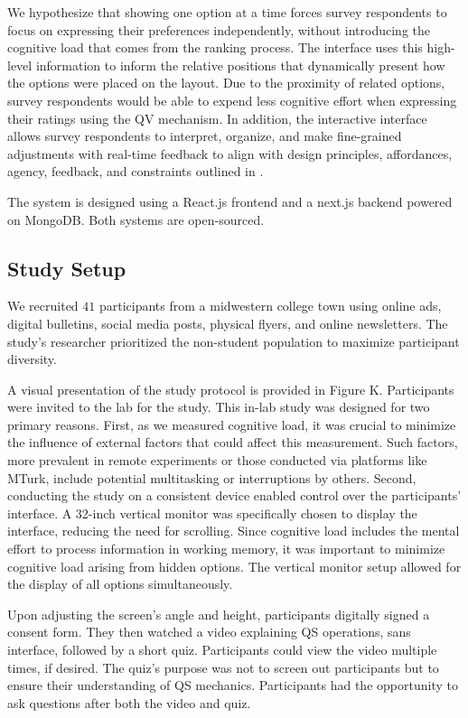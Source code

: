 We hypothesize that showing one option at a time forces survey respondents to focus on expressing their preferences independently, without introducing the cognitive load that comes from the ranking process. The interface uses this high-level information to inform the relative positions that dynamically present how the options were placed on the layout. Due to the proximity of related options, survey respondents would be able to expend less cognitive effort when expressing their ratings using the QV mechanism. In addition, the interactive interface allows survey respondents to interpret, organize, and make fine-grained adjustments with real-time feedback to align with design principles, affordances, agency, feedback, and constraints outlined in \cite{norman2013design}.

The system is designed using a React.js frontend and a next.js backend powered on MongoDB. Both systems are open-sourced.

\subsection{Study Setup}
We recruited $41$ participants from a midwestern college town using online ads, digital bulletins, social media posts, physical flyers, and online newsletters. The study's researcher prioritized the non-student population to maximize participant diversity.

A visual presentation of the study protocol is provided in Figure K. Participants were invited to the lab for the study. This in-lab study was designed for two primary reasons. First, as we measured cognitive load, it was crucial to minimize the influence of external factors that could affect this measurement. Such factors, more prevalent in remote experiments or those conducted via platforms like MTurk, include potential multitasking or interruptions by others. Second, conducting the study on a consistent device enabled control over the participants' interface. A 32-inch vertical monitor was specifically chosen to display the interface, reducing the need for scrolling. Since cognitive load includes the mental effort to process information in working memory, it was important to minimize cognitive load arising from hidden options. The vertical monitor setup allowed for the display of all options simultaneously.

Upon adjusting the screen's angle and height, participants digitally signed a consent form. They then watched a video explaining QS operations, sans interface, followed by a short quiz. Participants could view the video multiple times, if desired. The quiz's purpose was not to screen out participants but to ensure their understanding of QS mechanics. Participants had the opportunity to ask questions after both the video and quiz.

